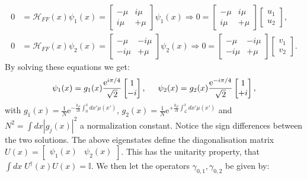 \begin{align}
0 &= \mathcal{H}_{FF}(x)\psi_1(x) = \begin{bmatrix} - \mu  & i\mu \\ i\mu & + \mu \end{bmatrix}\psi_1(x) \Rightarrow 0 = \begin{bmatrix} - \mu  & i\mu \\ i\mu & + \mu \end{bmatrix}\begin{bmatrix} u_1 \\ u_2 \end{bmatrix}, \nonumber \\
0 &= \mathcal{H}_{FF}(x)\psi_2(x) = \begin{bmatrix} - \mu  & -i\mu \\ -i\mu & + \mu \end{bmatrix}\psi_2(x) \Rightarrow 0 = \begin{bmatrix} - \mu  & -i\mu \\ -i\mu & + \mu \end{bmatrix}\begin{bmatrix} v_1 \\ v_2 \end{bmatrix} \nonumber.
\end{align}
By solving these equations we get:
\begin{equation}
\psi_1(x) = g_1(x)\frac{\text{e}^{i\pi/4}}{\sqrt{2}}\begin{bmatrix} 1 \\ -i \end{bmatrix}, \hspace{0.5cm} \psi_2(x) = g_2(x)\frac{\text{e}^{-i\pi/4}}{\sqrt{2}}\begin{bmatrix} 1 \\ +i \end{bmatrix}, \nonumber
\end{equation}
with $g_1(x) = \frac{1}{N}\text{e}^{-\frac{k_F}{\Delta}\int_{0}^{x} dx' \mu(x')}$, $g_2(x) = \frac{1}{N}\text{e}^{+\frac{k_F}{\Delta}\int_{\mathcal{L}}^{x} dx' \mu(x')}$ and $N^2 = \int dx |g_j(x)|^2$ a normalization constant. Notice the sign differences between the two solutions. The above eigenstates define the diagonalisation matrix $U(x) = \begin{bmatrix} \psi_1(x) & \psi_2(x) \end{bmatrix}$. This has the unitarity property, that $\int dx \; U^\dagger(x) U(x) = \mathbb{I}$. We then let the operators $\gamma_{0,1}, \gamma_{0,2}$ be given by:
